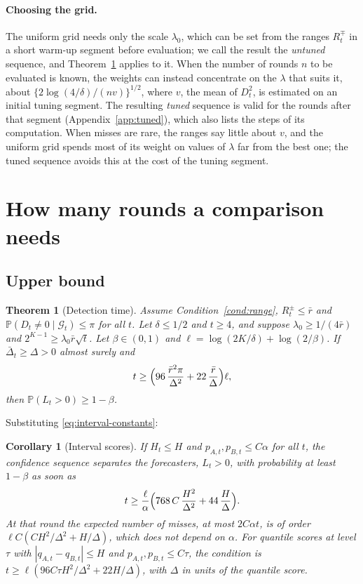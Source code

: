 \documentclass[11pt]{article}
\newtheorem{theorem}{Theorem}
\newtheorem{corollary}{Corollary}
\theoremstyle{remark}
\theoremstyle{definition}
\renewcommand{\Pr}{\mathbb{P}}
\newcommand{\G}{\mathcal{G}}
\newcommand{\rbar}{\bar r}
\newcommand{\Dbar}{\bar\Delta}
\begin{document}
\paragraph{Choosing the grid.}
The uniform grid needs only the scale $\lambda_0$, which can be set from the
ranges $R_t^\mp$ in a short warm-up segment before evaluation; we call the
result the \emph{untuned} sequence, and Theorem~\ref{thm:upper} applies to
it. When the number of rounds $n$ to be evaluated is known, the weights can
instead concentrate on the $\lambda$ that suits it, about
$\{2\log(4/\delta)/(nv)\}^{1/2}$, where $v$, the mean of $D_t^2$, is
estimated on an initial tuning segment. The resulting \emph{tuned} sequence
is valid for the rounds after that segment (Appendix~\ref{app:tuned}),
which also lists the steps of its computation.
When misses are rare, the ranges say little about $v$, and the uniform grid
spends most of its weight on values of $\lambda$ far from the best one; the
tuned sequence avoids this at the cost of the tuning segment.

\section{How many rounds a comparison needs}
\label{sec:rates}

\subsection{Upper bound}

\begin{theorem}[Detection time]
\label{thm:upper}
Assume Condition~\ref{cond:range}, $R_t^\pm\le\rbar$ and
$\Pr(D_t\ne0\mid\G_t)\le\pi$ for all $t$. Let $\delta\le1/2$ and
$t\ge4$, and suppose $\lambda_0\ge1/(4\rbar)$ and
$2^{K-1}\ge\lambda_0\rbar\sqrt t$. Let
$\beta\in(0,1)$ and $\ell=\log(2K/\delta)+\log(2/\beta)$. If
$\Dbar_t\ge\Delta>0$ almost surely and
\begin{equation}
 t\ge\Bigl(96\,\frac{\rbar^2\pi}{\Delta^2}+22\,\frac{\rbar}{\Delta}\Bigr)\ell,
 \label{eq:upper}
\end{equation}
then $\Pr(L_t>0)\ge1-\beta$.
\end{theorem}

Substituting
\eqref{eq:interval-constants}:

\begin{corollary}[Interval scores]
\label{cor:interval-upper}
If $H_t\le H$ and $p_{A,t},p_{B,t}\le C\alpha$ for all $t$, the confidence
sequence separates the forecasters, $L_t>0$, with probability at least
$1-\beta$ as soon as
\[
 t\ge\frac{\ell}{\alpha}\Bigl(768\,C\,\frac{H^2}{\Delta^2}+44\,\frac H\Delta\Bigr).
\]
At that round the expected number of misses, at most $2C\alpha t$, is of
order $\ell C(CH^2/\Delta^2+H/\Delta)$, which does not depend on $\alpha$.
For quantile scores at level $\tau$ with $|q_{A,t}-q_{B,t}|\le H$ and
$p_{A,t},p_{B,t}\le C\tau$, the condition is
$t\ge\ell(96C\tau H^2/\Delta^2+22H/\Delta)$, with $\Delta$ in units of the
quantile score.
\end{corollary}
\end{document}
